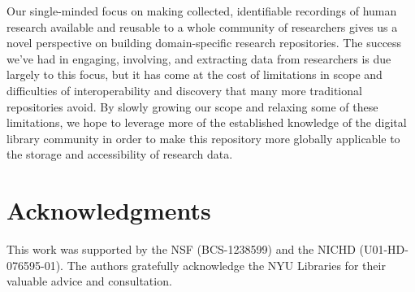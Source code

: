 \documentclass{sig-alternate}
\begin{document}
Our single-minded focus on making collected, identifiable recordings of human research available and reusable to a whole community of researchers gives us a novel perspective on building domain-specific research repositories.
The success we've had in engaging, involving, and extracting data from researchers is due largely to this focus, but it has come at the cost of limitations in scope and difficulties of interoperability and discovery that many more traditional repositories avoid.
By slowly growing our scope and relaxing some of these limitations, we hope to leverage more of the established knowledge of the digital library community in order to make this repository more globally applicable to the storage and accessibility of research data.

\section*{Acknowledgments}

This work was supported by the NSF (BCS-1238599) and the NICHD (U01-HD-076595-01).
The authors gratefully acknowledge the NYU Libraries for their valuable advice and consultation.



\end{document}
